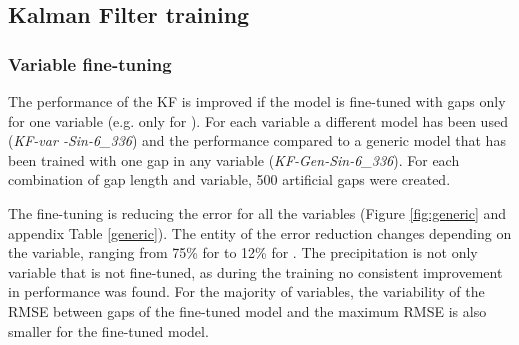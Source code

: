 \documentclass{article}
\let\Oldsubsection\subsection
\renewcommand{\subsection}{\FloatBarrier\Oldsubsection}
\begin{document}
\subsection{Kalman Filter training}

\subsubsection{Variable fine-tuning}

The performance of the KF is improved if the model is fine-tuned with gaps only for one variable (e.g. only for ). For each variable a different model has been used (\textit{KF-\textlangle var \textrangle-Sin-6\_336}) and the performance compared to a generic model that has been trained with one gap in any variable (\textit{KF-Gen-Sin-6\_336}). For each combination of gap length and variable, 500 artificial gaps were created.

The fine-tuning is reducing the error for all the variables (Figure \ref{fig:generic} and appendix Table \ref{generic}). The entity of the error reduction changes depending on the variable, ranging from 75\% for  to 12\% for .
The precipitation is not only variable that is not fine-tuned, as during the training no consistent improvement in performance was found.
For the majority of variables, the variability of the RMSE between gaps of the fine-tuned model and the maximum RMSE is also smaller for the fine-tuned model.

\end{document}
